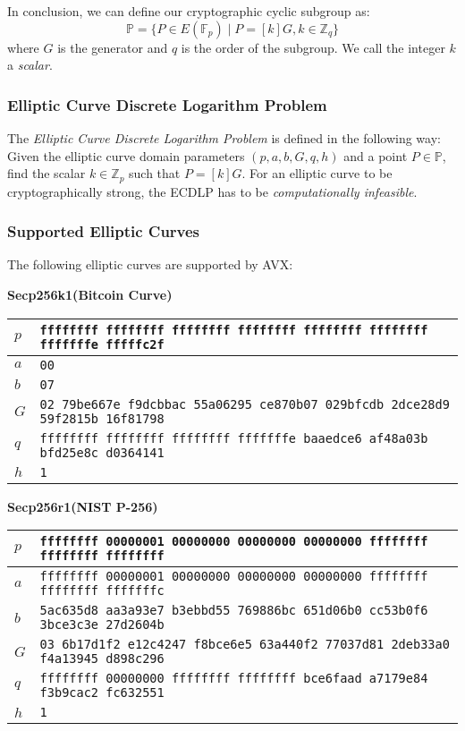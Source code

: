 In conclusion, we can define our cryptographic cyclic subgroup as:
\[ \mathbb{P} = \{ P \in E(\mathbb{F}_p) \mid P = [k]G, k \in \mathbb{Z}_q \} \]
where $G$ is the generator and $q$ is the order of the subgroup. We call the integer $k$ a \textit{scalar}.


\subsubsection{Elliptic Curve Discrete Logarithm Problem} \label{app: elliptic curve discrete logarithm problem}
The \textit{Elliptic Curve Discrete Logarithm Problem} is defined in \cite{Trappe05} the following way: Given the elliptic curve domain parameters $(p, a, b, G, q, h)$ and a point $P \in \mathbb{P}$, find the scalar $k \in \mathbb{Z}_p$ such that $P = [k]G$. For an elliptic curve to be cryptographically strong, the ECDLP has to be \textit{computationally infeasible}.


\subsubsection{Supported Elliptic Curves}
The following elliptic curves are supported by AVX:

\textbf{Secp256k1(Bitcoin Curve)} 
\par
\begin{tabularx}{\textwidth}{|l|>{\raggedright\arraybackslash}X|} \hline
    $p$ & \texttt{ffffffff ffffffff ffffffff ffffffff ffffffff ffffffff fffffffe fffffc2f} \\ \hline
    $a$ & \texttt{\phantom{000000}00} \\ \hline
    $b$ & \texttt{\phantom{000000}07} \\ \hline
    $G$ & \texttt{\phantom{000000}02 79be667e f9dcbbac 55a06295 ce870b07 029bfcdb 2dce28d9 59f2815b 16f81798} \\ \hline
    $q$ & \texttt{ffffffff ffffffff ffffffff fffffffe baaedce6 af48a03b bfd25e8c d0364141} \\ \hline
    $h$ & \texttt{1} \\ \hline
\end{tabularx}    

\textbf{Secp256r1(NIST P-256)}
\par
\begin{tabularx}{\textwidth}{|l|>{\raggedright\arraybackslash}X|} \hline
    $p$ & \texttt{ffffffff 00000001 00000000 00000000 00000000 ffffffff ffffffff ffffffff} \\ \hline
    $a$ & \texttt{ffffffff 00000001 00000000 00000000 00000000 ffffffff ffffffff fffffffc} \\ \hline
    $b$ & \texttt{5ac635d8 aa3a93e7 b3ebbd55 769886bc 651d06b0 cc53b0f6 3bce3c3e 27d2604b} \\ \hline
    $G$ & \texttt{\phantom{000000}03 6b17d1f2 e12c4247 f8bce6e5 63a440f2 77037d81 2deb33a0 f4a13945 d898c296} \\ \hline
    $q$ & \texttt{ffffffff 00000000 ffffffff ffffffff bce6faad a7179e84 f3b9cac2 fc632551} \\ \hline
    $h$ & \texttt{1} \\ \hline
\end{tabularx}

